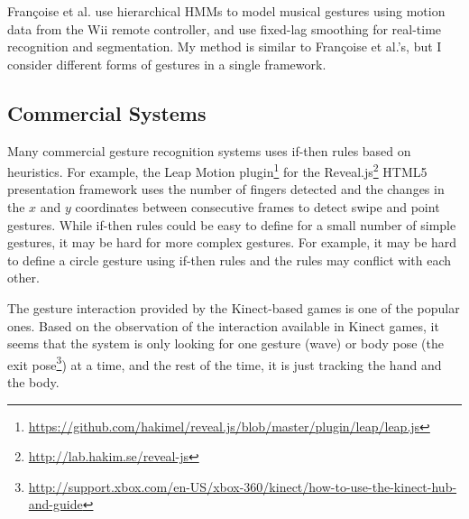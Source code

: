 Fran{\c{c}}oise et al. \cite{francoise11} use hierarchical HMMs to model musical
gestures using motion data from the Wii remote controller, and use fixed-lag
smoothing for real-time recognition and segmentation.
My method is similar to Fran{\c{c}}oise et al.'s, but I consider different
forms of gestures in a single framework.

\subsection{Commercial Systems}
Many commercial gesture recognition systems uses if-then rules based on
heuristics. For example, the Leap Motion
plugin\footnote{\url{https://github.com/hakimel/reveal.js/blob/master/plugin/leap/leap.js}}
for the Reveal.js\footnote{\url{http://lab.hakim.se/reveal-js}} HTML5
presentation framework uses the number of fingers detected and the changes in the $x$ and $y$ coordinates between consecutive
frames to detect swipe and point gestures. While if-then rules could be easy to define for
a small number of simple gestures, it may be hard for more complex gestures.
For example, it may be hard to define a circle gesture using if-then rules and
the rules may conflict with each other.

The gesture interaction provided by the Kinect-based games is
one of the popular ones. Based on the observation of the interaction
available in Kinect games, it seems that the system is only looking for one
gesture (wave) or body pose (the exit
pose\footnote{\url{http://support.xbox.com/en-US/xbox-360/kinect/how-to-use-the-kinect-hub-and-guide}}) at a time, and the rest of the time, 
it is just tracking the hand and the body.

% 

